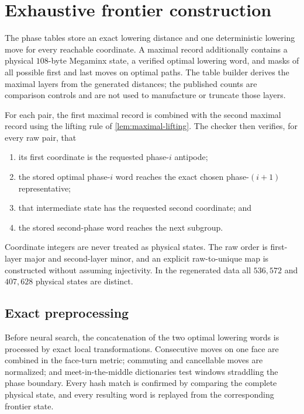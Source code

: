 \section{Exhaustive frontier construction}
\label{sec:frontier}

The phase tables store an exact lowering distance and one deterministic
lowering move for every reachable coordinate.  A maximal record additionally
contains a physical $108$-byte Megaminx state, a verified optimal lowering
word, and masks of all possible first and last moves on optimal paths.  The
table builder derives the maximal layers from the generated distances; the
published counts are comparison controls and are not used to manufacture or
truncate those layers.

For each pair, the first maximal record is combined with the second maximal
record using the lifting rule of \cref{lem:maximal-lifting}.  The checker then
verifies, for every raw pair, that
\begin{enumerate}
  \item its first coordinate is the requested phase-$i$ antipode;
  \item the stored optimal phase-$i$ word reaches the exact chosen
    phase-$(i+1)$ representative;
  \item that intermediate state has the requested second coordinate; and
  \item the stored second-phase word reaches the next subgroup.
\end{enumerate}
Coordinate integers are never treated as physical states.  The raw order is
first-layer major and second-layer minor, and an explicit raw-to-unique map is
constructed without assuming injectivity.  In the regenerated data all
$536{,}572$ and $407{,}628$ physical states are distinct.

\subsection{Exact preprocessing}
\label{sec:exact-preprocessing}

Before neural search, the concatenation of the two optimal lowering words is
processed by exact local transformations.  Consecutive moves on one face are
combined in the face-turn metric; commuting and cancellable moves are
normalized; and meet-in-the-middle dictionaries test windows straddling the
phase boundary.  Every hash match is confirmed by comparing the complete
physical state, and every resulting word is replayed from the corresponding
frontier state.

